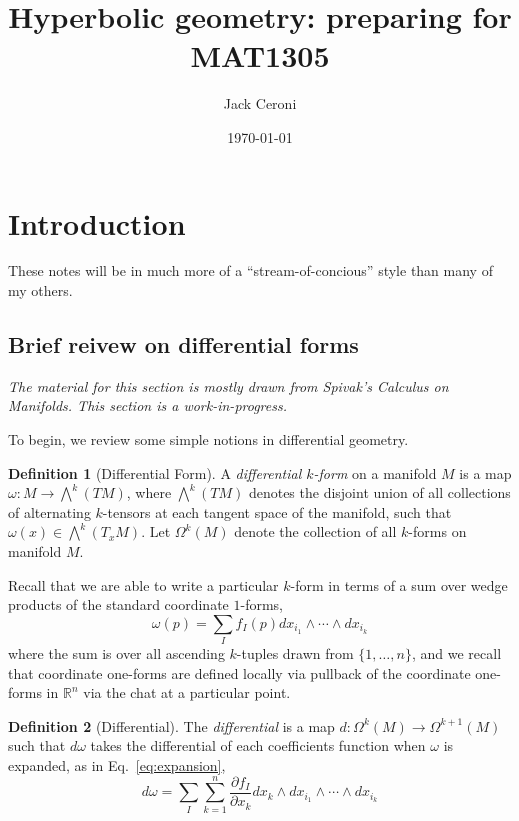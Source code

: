 \documentclass[aps,pra,showpacs,notitlepage,onecolumn,superscriptaddress,nofootinbib]{revtex4-1}
\newcommand{\Wedge}{\bigwedge}
\theoremstyle{definition}
\newtheorem{definition}{Definition}[section]
\begin{document}
\title{Hyperbolic geometry: preparing for MAT1305}
\author{Jack Ceroni}
\date{\today}


\maketitle

\section{Introduction}

\noindent
These notes will be in much more of a ``stream-of-concious'' style than many of my others.

\subsection{Brief reivew on differential forms}

\noindent
\textit{The material for this section is mostly drawn from Spivak's Calculus on Manifolds. This section is a work-in-progress.}

\hrulefill

\noindent
To begin, we review some simple notions in differential geometry.
\begin{definition}[Differential Form]
  A \emph{differential $k$-form} on a manifold $M$ is a map $\omega : M \rightarrow \Wedge^{k}(TM)$, where $\Wedge^{k}(TM)$ denotes the disjoint union of all collections of alternating $k$-tensors
  at each tangent space of the manifold, such that $\omega(x) \in \Wedge^{k}(T_x M)$. Let $\Omega^{k}(M)$ denote the collection of all $k$-forms on manifold $M$.
\end{definition}

\noindent
Recall that we are able to write a particular $k$-form in terms of a sum over wedge products of the standard coordinate $1$-forms,
\begin{equation}
  \label{eq:expansion}
  \omega(p) = \displaystyle\sum_{I} f_{I}(p) dx_{i_1} \wedge \cdots \wedge dx_{i_k}
\end{equation}
where the sum is over all ascending $k$-tuples drawn from $\{1, \dots, n\}$, and we recall that coordinate one-forms are defined locally via pullback of the coordinate one-forms in $\mathbb{R}^{n}$
via the chat at a particular point.

\begin{definition}[Differential]
  The \emph{differential} is a map $d : \Omega^k(M) \rightarrow \Omega^{k + 1}(M)$ such that $d\omega$ takes the differential of each coefficients function
  when $\omega$ is expanded, as in Eq.~\eqref{eq:expansion},
  \begin{equation}
    d\omega = \displaystyle\sum_{I} \displaystyle\sum_{k = 1}^{n} \frac{\partial f_I}{\partial x_k} dx_k \wedge dx_{i_1} \wedge \cdots \wedge dx_{i_k}
    \end{equation}
\end{definition}
\end{document}
